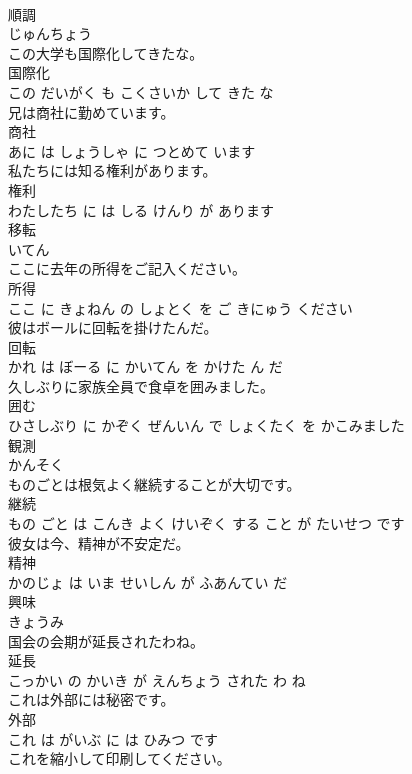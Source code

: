 \documentclass[8pt]{extreport}
\begin{document}
\begin{CJK}{UTF8}{min}
\\	順調	
\\	じゅんちょう		
\\	この大学も国際化してきたな。	
\\	国際化 
\\	この だいがく も こくさいか して きた な		
\\	兄は商社に勤めています。	
\\	商社 
\\	あに は しょうしゃ に つとめて います		
\\	私たちには知る権利があります。	
\\	権利 
\\	わたしたち に は しる けんり が あります		
\\	移転	
\\	いてん		
\\	ここに去年の所得をご記入ください。	
\\	所得 
\\	ここ に きょねん の しょとく を ご きにゅう ください		
\\	彼はボールに回転を掛けたんだ。	
\\	回転 
\\	かれ は ぼーる に かいてん を かけた ん だ		
\\	久しぶりに家族全員で食卓を囲みました。	
\\	囲む 
\\	ひさしぶり に かぞく ぜんいん で しょくたく を かこみました		
\\	観測	
\\	かんそく		
\\	ものごとは根気よく継続することが大切です。	
\\	継続 
\\	もの ごと は こんき よく けいぞく する こと が たいせつ です		
\\	彼女は今、精神が不安定だ。	
\\	精神 
\\	かのじょ は いま せいしん が ふあんてい だ		
\\	興味	
\\	きょうみ		
\\	国会の会期が延長されたわね。	
\\	延長 
\\	こっかい の かいき が えんちょう された わ ね		
\\	これは外部には秘密です。	
\\	外部 
\\	これ は がいぶ に は ひみつ です		
\\	これを縮小して印刷してください。	

\end{CJK}
\end{document}
